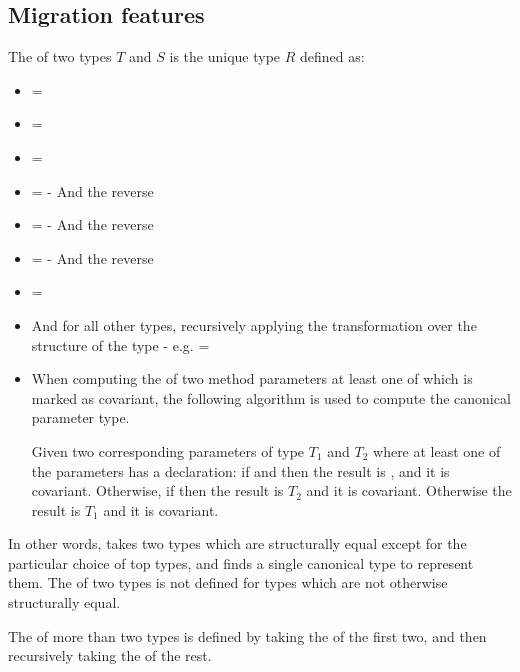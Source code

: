 \documentclass[makeidx]{article}
\begin{document}
{\subsection{Migration features}

The \TopMergeTypeName{} of two types $T$ and $S$ is the unique type $R$ defined
as:

\begin{itemize}
\item {} = 
\item \TopMergeType{\DYNAMIC}{\DYNAMIC} = \code{\DYNAMIC}
\item \TopMergeType{\VOID}{\VOID} = \code{\VOID}
\item {} = 
   - And the reverse
\item \TopMergeType{\DYNAMIC}{\VOID} = 
   - And the reverse
\item {} = 
   - And the reverse
\item {} = 
\item And for all other types, recursively applying the transformation over the
  structure of the type
  - e.g.  = 
\item When computing the \TopMergeTypeName{} of two method parameters at least one of
  which is marked as covariant, the following algorithm is used to compute the
  canonical parameter type.

  Given two corresponding parameters of type $T_1$ and $T_2$ where at least
  one of the parameters has a \COVARIANT{} declaration:
  if  and  then the result is ,
     and it is covariant.
  Otherwise, if  then the result is $T_2$ and it is covariant.
  Otherwise the result is $T_1$ and it is covariant.
\end{itemize}

In other words, \TopMergeTypeName{} takes two types which are structurally equal
except for the particular choice of top types, and
finds a single canonical type to represent them.
The \TopMergeTypeName{} of two types is not defined for
types which are not otherwise structurally equal.

The \TopMergeTypeName{} of more than two types is defined by taking the
\TopMergeTypeName{} of the first two, and then recursively taking the
\TopMergeTypeName{} of the rest.

}
\end{document}
